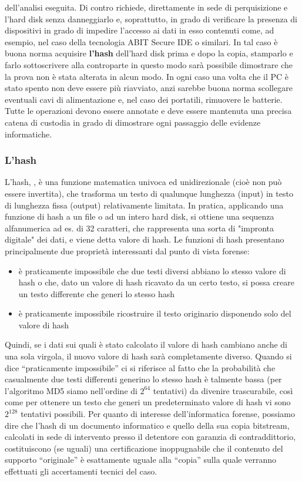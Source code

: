 dell'analisi eseguita. Di contro richiede, direttamente in sede di perquisizione e l'hard disk senza danneggiarlo e, soprattutto, in grado di verificare la presenza di dispositivi in grado di impedire l'accesso ai dati in esso contenuti come, ad esempio, nel caso della tecnologia ABIT Secure IDE o similari. In tal caso è buona norma acquisire \textbf{l'hash} dell'hard disk prima e dopo la copia, stamparlo e farlo sottoscrivere alla controparte in questo modo sarà possibile dimostrare che la prova non è stata alterata in alcun modo.  In ogni caso una volta che il PC è stato spento non deve essere più riavviato, anzi sarebbe buona norma scollegare eventuali cavi di alimentazione e, nel caso dei portatili, rimuovere le batterie. Tutte le operazioni devono essere annotate e deve essere mantenuta una precisa catena di custodia in grado di dimostrare ogni passaggio delle evidenze informatiche. 
\subsubsection{L'hash}
L'hash, \cite{hash-informatica-forense}, è una funzione matematica univoca ed unidirezionale (cioè non può essere invertita), che trasforma un testo di qualunque lunghezza (input) in testo di lunghezza fissa (output) relativamente limitata. In pratica, applicando una funzione di hash a un file o ad un intero hard disk, si ottiene una sequenza alfanumerica ad es. di 32 caratteri, che rappresenta una sorta di "impronta digitale" dei dati, e viene detta valore di hash. Le funzioni di hash presentano principalmente due proprietà interessanti dal punto di vista forense: \begin{itemize}
    \item è praticamente impossibile che due testi diversi abbiano lo stesso valore di hash o che, dato un valore di hash ricavato da un certo testo, si possa creare un testo differente che generi lo stesso hash
    \item è praticamente impossibile ricostruire il testo originario disponendo solo del valore di hash
\end{itemize}
Quindi, se i dati sui quali è stato calcolato il valore di hash cambiano anche di una sola virgola, il nuovo valore di hash sarà completamente diverso.
Quando si dice “praticamente impossibile” ci si riferisce al fatto che la probabilità che casualmente due testi differenti generino lo stesso hash è talmente bassa (per l’algoritmo MD5 siamo nell’ordine di $2^{64}$ tentativi) da divenire trascurabile, così come per ottenere un testo che generi un predeterminato valore di hash vi sono $2^{128}$ tentativi possibili.
Per quanto di interesse dell’informatica forense, possiamo dire che l’hash di un documento informatico e quello della sua copia bitstream, calcolati in sede di intervento presso il detentore con garanzia di contraddittorio, costituiscono (se uguali) una certificazione inoppugnabile che il contenuto del supporto “originale” è esattamente uguale alla “copia” sulla quale verranno effettuati gli accertamenti tecnici del caso.

